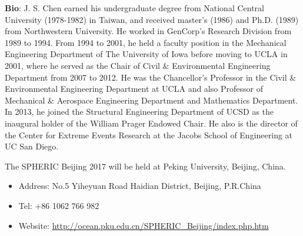 
\textbf{Bio}: J. S. Chen earned his undergraduate degree from National Central University (1978-1982) in Taiwan, and received master's (1986) and Ph.D. (1989) from Northwestern University. He worked in GenCorp's Research Division from 1989 to 1994. From 1994 to 2001, he held a faculty position in the Mechanical Engineering Department of The University of Iowa before moving to UCLA in 2001, where he served as the Chair of Civil \& Environmental Engineering Department from 2007 to 2012. He was the Chancellor's Professor in the Civil \& Environmental Engineering Department at UCLA and also Professor of Mechanical \& Aerospace Engineering Department and Mathematics Department. In 2013, he joined the Structural Engineering Department of UCSD as the inaugural holder of the William Prager Endowed Chair. He also is the director of the Center for Extreme Events Research at the Jacobs School of Engineering at UC San Diego.




\newpage
{}
{}
The SPHERIC Beijing 2017 will be held at Peking University, Beijing, China.
\begin{itemize}
\item Address: No.5 Yiheyuan Road Haidian District, Beijing, P.R.China 
\item Tel:  +86 1062 766 982
\item Website: \url{http://ocean.pku.edu.cn/SPHERIC_Beijing/index.php.htm}
\end{itemize}

